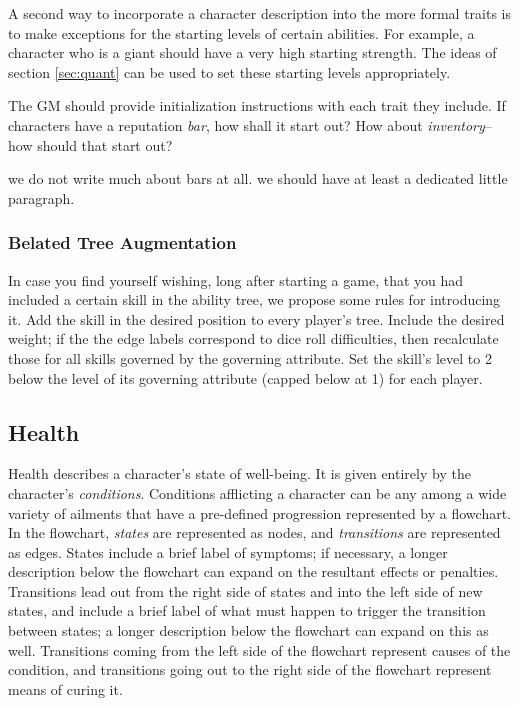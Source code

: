 \documentclass[12pt]{article}
\newcommand{\notes}[1]{{\color{Tan} #1}}
\newcommand{\emdex}[1]{\emph{#1}\index{#1}}
\begin{document}
A second way to incorporate a character description into the more formal traits
is to make exceptions for the starting levels of certain abilities.
For example, a character who is a giant should have a very high starting strength.
The ideas of section \ref{sec:quant} can be used to set these starting levels appropriately.

The GM should provide initialization instructions with each trait they include.
If characters have a reputation \emph{bar}, how shall it start out?
How about \emph{inventory}--how should that start out?

\notes{we do not write much about bars at all. we should have at least a dedicated little paragraph.}

\subsubsection{Belated Tree Augmentation}\label{sec:bta}

In case you find yourself wishing, long after starting a game,
that you had included a certain skill in the ability tree,
we propose some rules for introducing it.
Add the skill in the desired position to every player's tree.
Include the desired weight;
if the the edge labels correspond to dice roll difficulties, then recalculate those for all skills governed by the governing attribute.
Set the skill's level to 2 below the level of its governing attribute (capped below at 1) for each player.


\subsection{Health} \label{sec:health}
Health describes a character's state of well-being. It is given entirely by the character's \emdex{conditions}. 
Conditions afflicting a character can be any among a wide variety of ailments that have a pre-defined progression 
represented by a flowchart. 
In the flowchart, \emph{states} are represented as nodes, and \emph{transitions} are represented as edges. States 
include a brief label of symptoms; if necessary, a longer description below the flowchart can expand on 
the resultant effects or penalties. Transitions lead out from the right side of states and into the left side 
of new states, and include a brief label of what must happen to trigger the transition between states; 
a longer description below the flowchart can expand on this as well. Transitions coming from the left side of 
the flowchart represent causes of the condition, and transitions going out to the right side of the flowchart represent 
means of curing it.
\end{document}
